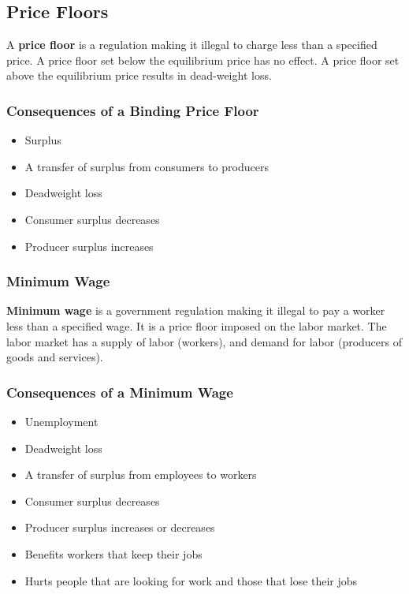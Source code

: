 \documentclass[letterpaper, 12pt]{article}
\begin{document}
\subsection{Price Floors}
A \textbf{price floor} is a regulation making it illegal to charge less than a
specified price. A price floor set below the equilibrium price has no effect.
A price floor set above the equilibrium price results in dead-weight loss.

\subsubsection{Consequences of a Binding Price Floor}
\begin{itemize}
  \item Surplus
  \item A transfer of surplus from consumers to producers
  \item Deadweight loss
  \item Consumer surplus decreases
  \item Producer surplus increases
\end{itemize}

\subsubsection{Minimum Wage}
\textbf{Minimum wage} is a government regulation making it illegal to pay a
worker less than a specified wage. It is a price floor imposed on the labor
market. The labor market has a supply of labor (workers), and demand for labor
(producers of goods and services).

\subsubsection{Consequences of a Minimum Wage}
\begin{itemize}
  \item Unemployment
  \item Deadweight loss
  \item A transfer of surplus from employees to workers
  \item Consumer surplus decreases
  \item Producer surplus increases or decreases
  \item Benefits workers that keep their jobs
  \item Hurts people that are looking for work and those that lose their jobs
\end{itemize}
\end{document}
